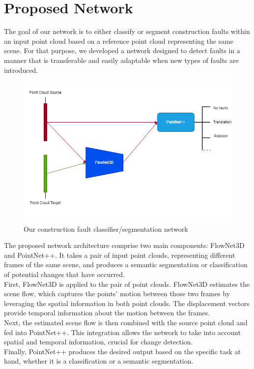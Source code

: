 \section{Proposed Network}
The goal of our network is to either classify or segment construction faults within an input point cloud based on a reference point cloud representing the same scene. For that purpose, we developed a network designed to detect faults in a manner that is transferable and easily adaptable when new types of faults are introduced.
\begin{figure}[H]
    \centering
    \includegraphics[width=\textwidth]{Img/05_OurNetwork.png}
    \caption{Our construction fault classifier/segmentation network}
    \label{fig:Ours}
\end{figure}
The proposed network architecture comprise two main components: FlowNet3D and PointNet++. It takes a pair of input point clouds, representing different frames of the same scene, and produces a semantic segmentation or classification of potential changes that have occurred.\\

First, FlowNet3D is applied to the pair of point clouds. FlowNet3D estimates the scene flow, which captures the points' motion between those two frames by leveraging the spatial information in both point clouds. The displacement vectors provide temporal information about the motion between the frames.\\

Next, the estimated scene flow is then combined with the source point cloud and fed into PointNet++. This integration allows the network to take into account spatial and temporal information, crucial for change detection.\\

Finally, PointNet++ produces the desired output based on the specific task at hand, whether it is a classification or a semantic segmentation. 